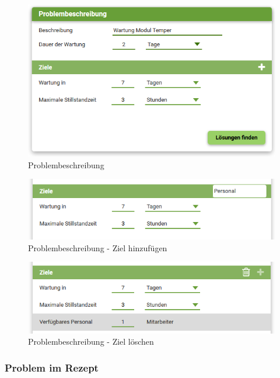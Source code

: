 \begin{figure}[htbp]
\centering
\includegraphics[scale=0.7]{DA_files/Bilder/Konzept/Skizze-Problem-1.png}
\caption{Problembeschreibung}
\label{pic:pD-Problembeschreibung}
\end{figure}

\begin{figure}[htbp]
\centering
\includegraphics[scale=0.7]{DA_files/Bilder/Konzept/Skizze-Problem-Ziel.png}
\caption{Problembeschreibung - Ziel hinzufügen}
\label{pic:pD-Problembeschreibung-Ziel-hinzufuegen}
\end{figure}

\begin{figure}[htbp]
\centering
\includegraphics[scale=0.7]{DA_files/Bilder/Konzept/Skizze-Problem-loeschen.png}
\caption{Problembeschreibung - Ziel löschen}
\label{pic:pD-Problembeschreibung-Ziel-loeschen}
\end{figure}

\subsubsection*{Problem im Rezept}

